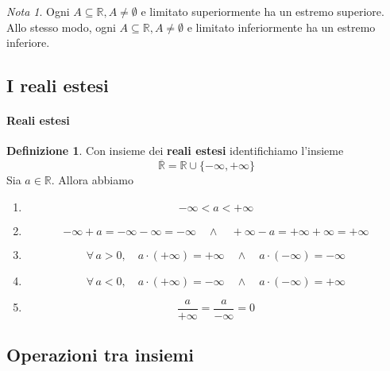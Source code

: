 \documentclass{article}
\theoremstyle{plain}
\theoremstyle{definition}
\newtheorem{defn}{Definizione}[section]
\theoremstyle{remark}
\newtheorem{note}{Nota}
\begin{document}
\vspace{10pt}

\begin{note}
    Ogni $A\subseteq\mathbb{R},A\neq\emptyset$ e limitato superiormente ha un estremo superiore.
    Allo stesso modo, ogni $A\subseteq\mathbb{R},A\neq\emptyset$ e limitato inferiormente ha un estremo inferiore.
\end{note}

\vspace{10pt}

\subsection{I reali estesi}

\vspace{10pt}

\paragraph{Reali estesi}
\begin{bxthm}
\begin{defn}
    Con insieme dei \textbf{reali estesi} identifichiamo l'insieme
    \[ \overline{\mathbb{R}}=\mathbb{R}\cup\{-\infty,+\infty\} \]
    Sia $a\in \mathbb{R}$. Allora abbiamo 
    \begin{enumerate}
        \item \[-\infty<a<+\infty\]
        \item \[-\infty+a=-\infty-\infty=-\infty\quad\land\quad+\infty-a=+\infty+\infty=+\infty\]
        \item \[\forall\, a>0,\quad a\cdot(+\infty)=+\infty\quad\land\quad a\cdot(-\infty)=-\infty\]
        \item \[\forall\, a<0,\quad a\cdot(+\infty)=-\infty\quad\land\quad a\cdot(-\infty)=+\infty\]
        \item \[\dfrac{a}{+\infty}=\dfrac{a}{-\infty}=0\]
    \end{enumerate}
\end{defn}
\end{bxthm}

\vspace{10pt}

\subsection{Operazioni tra insiemi}

\vspace{10pt}
\end{document}
